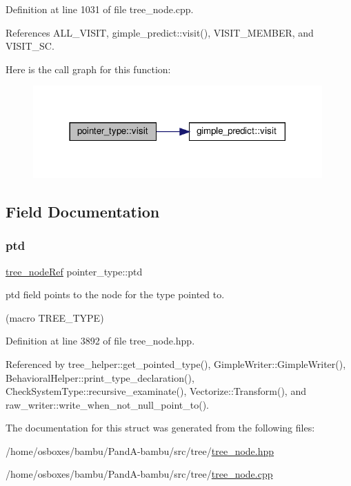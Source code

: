 Definition at line 1031 of file tree\+\_\+node.\+cpp.



References A\+L\+L\+\_\+\+V\+I\+S\+IT, gimple\+\_\+predict\+::visit(), V\+I\+S\+I\+T\+\_\+\+M\+E\+M\+B\+ER, and V\+I\+S\+I\+T\+\_\+\+SC.

Here is the call graph for this function\+:
\nopagebreak
\begin{figure}[H]
\begin{center}
\leavevmode
\includegraphics[width=314pt]{db/d0b/structpointer__type_aa2f2890548ddc7599a180a59c1635c93_cgraph}
\end{center}
\end{figure}


\subsection{Field Documentation}
\mbox{\label{structpointer__type_aa4c2e5f89dde51339a5bdb61396312b1}} 
\subsubsection{\texorpdfstring{ptd}{ptd}}
{\footnotesize\ttfamily \hyperlink{tree__node_8hpp_a6ee377554d1c4871ad66a337eaa67fd5}{tree\+\_\+node\+Ref} pointer\+\_\+type\+::ptd}



ptd field points to the node for the type pointed to. 

(macro T\+R\+E\+E\+\_\+\+T\+Y\+PE) 

Definition at line 3892 of file tree\+\_\+node.\+hpp.



Referenced by tree\+\_\+helper\+::get\+\_\+pointed\+\_\+type(), Gimple\+Writer\+::\+Gimple\+Writer(), Behavioral\+Helper\+::print\+\_\+type\+\_\+declaration(), Check\+System\+Type\+::recursive\+\_\+examinate(), Vectorize\+::\+Transform(), and raw\+\_\+writer\+::write\+\_\+when\+\_\+not\+\_\+null\+\_\+point\+\_\+to().



The documentation for this struct was generated from the following files\+:\begin{DoxyCompactItemize}
\item 
/home/osboxes/bambu/\+Pand\+A-\/bambu/src/tree/\hyperlink{tree__node_8hpp}{tree\+\_\+node.\+hpp}\item 
/home/osboxes/bambu/\+Pand\+A-\/bambu/src/tree/\hyperlink{tree__node_8cpp}{tree\+\_\+node.\+cpp}\end{DoxyCompactItemize}
